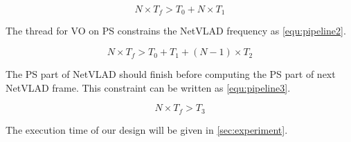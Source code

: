 \begin{equation}
    N \times T_{f} > T_{0} + N \times T_{1}
    \label{equ:pipeline1}
\end{equation}

The thread for VO on PS constrains the NetVLAD frequency as \cref{equ:pipeline2}.

\begin{equation}
    N \times T_{f} > T_{0} + T_{1} + (N-1) \times T_{2}
    \label{equ:pipeline2}
\end{equation}

The PS part of NetVLAD should finish before computing the PS part of next NetVLAD frame. This constraint can be written as \cref{equ:pipeline3}.


\begin{equation}
    N \times T_{f} > T_{3}
    \label{equ:pipeline3}
\end{equation}

The execution time of our design will be given in \cref{sec:experiment}.
